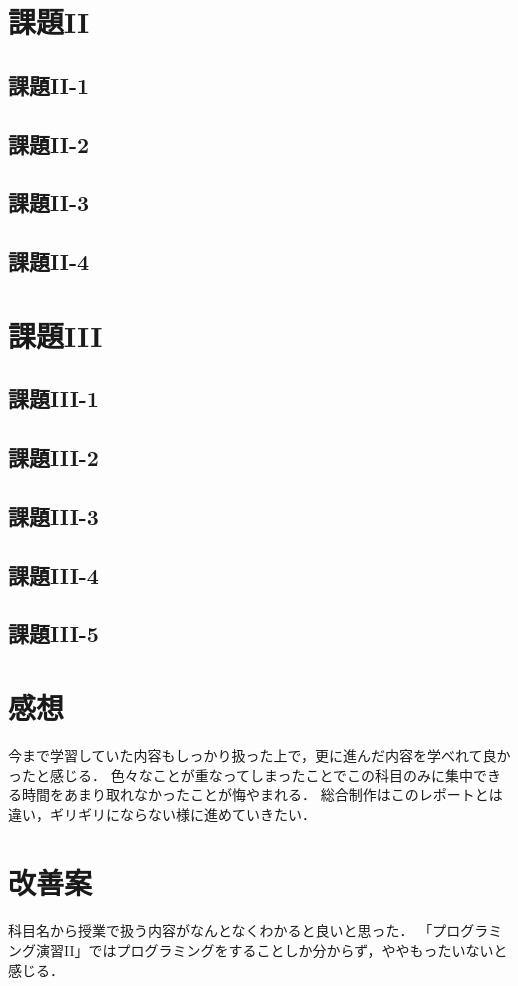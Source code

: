 \documentclass[]{jarticle}
\begin{document}
\section{課題II}
\subsection{課題II-1}
\subsection{課題II-2}
\subsection{課題II-3}
\subsection{課題II-4}

\section{課題III}
\subsection{課題III-1}
\subsection{課題III-2}
\subsection{課題III-3}
\subsection{課題III-4}
\subsection{課題III-5}
\section{感想}
今まで学習していた内容もしっかり扱った上で，更に進んだ内容を学べれて良かったと感じる．
色々なことが重なってしまったことでこの科目のみに集中できる時間をあまり取れなかったことが悔やまれる．
総合制作はこのレポートとは違い，ギリギリにならない様に進めていきたい．

\section{改善案}
科目名から授業で扱う内容がなんとなくわかると良いと思った．
「プログラミング演習II」ではプログラミングをすることしか分からず，ややもったいないと感じる．
\end{document}
